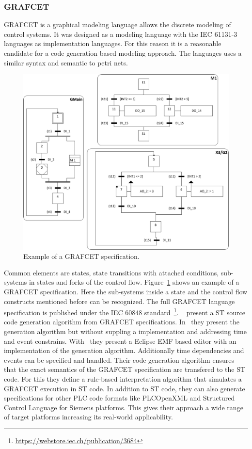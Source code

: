 \subsubsection{GRAFCET}
\label{sec:sub:grafcet}

GRAFCET is a graphical modeling language allows the discrete modeling of control systems.
It was designed as a modeling language with the IEC 61131-3 languages as implementation languages.
For this reason it is a reasonable candidate for a code generation based modeling approach.
The languages uses a similar syntax and semantic to petri nets.
\begin{figure}
	\includegraphics[width=\textwidth]{./Figures/grafcet_ex.jpg}
	\caption[Example of a GRAFCET specification.]{Example of a GRAFCET specification.~\cite{JULIUS2017173}}
	\label{fig:grafcet}
\end{figure}
Common elements are states, state transitions with attached conditions, sub-systems in states and forks of the control flow.
Figure~\ref{fig:grafcet} shows an example of a GRAFCET specification.
Here the sub-systems inside a state and the control flow constructs mentioned before can be recognized.
The full GRAFCET language specification is published under the IEC 60848 standard~\footnote{\url{https://webstore.iec.ch/publication/3684}}.
\citeauthor{JULIUS20191767}~\cite{JULIUS20191767, JULIUS2017173} present a ST source code generation algorithm from GRAFCET specifications.
In~\cite{JULIUS2017173} they present the generation algorithm but without suppling a implementation and addressing time and event constrains.
With~\cite{JULIUS20191767} they present a Eclipse EMF based editor with an implementation of the generation algorithm.
Additionally time dependencies and events can be specified and handled.
Their code generation algorithm ensures that the exact semantics of the GRAFCET specification are transfered to the ST code.
For this they define a rule-based interpretation algorithm that simulates a GRAFCET execution in ST code.
In addition to ST code, they can also generate specifications for other PLC code formats like PLCOpenXML and Structured Control Language for Siemens platforms.
This gives their approach a wide range of target platforms increasing its real-world applicability.


